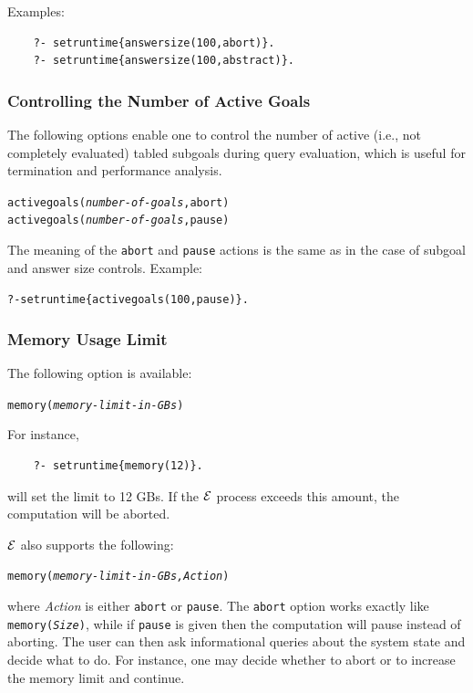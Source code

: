 \documentclass[11pt]{article}
\newcommand{\ERGO}{\mbox{\ensuremath{\cal{E}}\smaller{{\sc{RGO}}}}\xspace}
\newcommand{\FLSYSTEM}{\ERGO}
\begin{document}
Examples:
\begin{verbatim}
    ?- setruntime{answersize(100,abort)}.
    ?- setruntime{answersize(100,abstract)}.
\end{verbatim}

\subsubsection{Controlling the Number of Active Goals}

The following options enable one to control the number of active (i.e., not
completely evaluated) tabled subgoals during query evaluation, which is
useful for termination and performance analysis.

\begin{alltt}
    activegoals(\emph{number-of-goals},abort)
    activegoals(\emph{number-of-goals},pause)
\end{alltt}
The meaning of the \texttt{abort}   and \texttt{pause}  actions
is the same as in the case of subgoal and answer size controls.
Example:
\begin{alltt}
    ?- setruntime\{activegoals(100,pause)\}.
\end{alltt}

\subsubsection{Memory Usage Limit}

The following option is available:
\begin{alltt}
    memory(\textit{memory-limit-in-GBs})
\end{alltt}
For instance,
\begin{verbatim}
    ?- setruntime{memory(12)}.
\end{verbatim}
will set the limit to 12 GBs. If the \FLSYSTEM process exceeds this amount,
the computation will be aborted.

\noindent
\ERGO also supports the following:
\begin{alltt}
    memory(\textit{memory-limit-in-GBs,Action})
\end{alltt}
where \emph{Action} is either \texttt{abort} or \texttt{pause}. The
\texttt{abort} option works exactly like
\texttt{memory(\textit{Size})}, while if \texttt{pause} is given then
the computation will pause instead of aborting. The user can then ask
informational queries about the system state and decide what to do.
For instance, one may decide whether to abort or to increase the memory
limit and continue.
\end{document}
